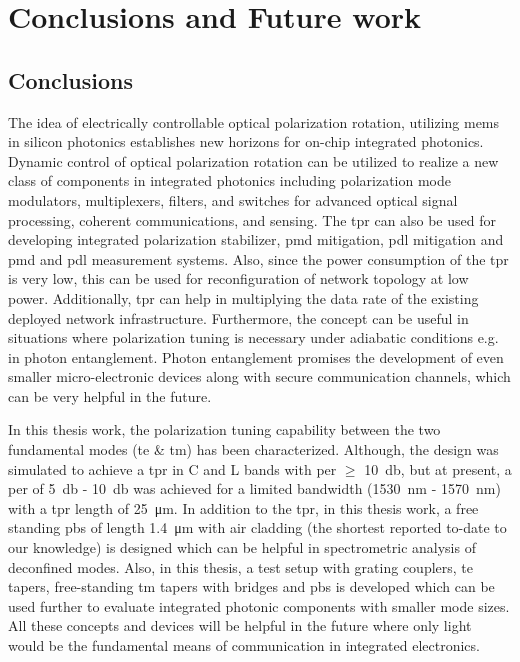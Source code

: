 \documentclass[../report.tex]{subfiles}
\begin{document}
		
\chapter{Conclusions and Future work}

\section{Conclusions}
The idea of electrically controllable optical polarization rotation, utilizing \gls{mems} in silicon photonics establishes new horizons for on-chip integrated photonics. Dynamic control of optical polarization rotation can be utilized to realize a new class of components in integrated photonics including polarization mode modulators, multiplexers, filters, and switches for advanced optical signal processing, coherent communications, and sensing. The \gls{tpr} can also be used for developing integrated polarization stabilizer, \gls{pmd} mitigation, \gls{pdl} mitigation and \gls{pmd} and \gls{pdl} measurement systems. Also, since the power consumption of the \gls{tpr} is very low, this can be used for reconfiguration of network topology at low power. Additionally, \gls{tpr} can help in multiplying the data rate of the existing deployed network infrastructure. Furthermore, the concept can be useful in situations where polarization tuning is necessary under adiabatic conditions e.g. in photon entanglement. Photon entanglement promises the development of even smaller micro-electronic devices along with secure communication channels, which can be very helpful in the future. \par 

In this thesis work, the polarization tuning capability between the two fundamental modes (\gls{te} \& \gls{tm}) has been characterized. Although, the design was simulated to achieve a \gls{tpr} in C and L bands with \gls{per} $\geq$ \SI{10}{\decibel}, but at present, a \gls{per} of \SI{5}{\decibel} - \SI{10}{\decibel} was achieved for a limited bandwidth (\SI{1530}{\nano \meter} - \SI{1570}{\nano \meter}) with a \gls{tpr} length of \SI{25}{\micro \meter}. In addition to the \gls{tpr}, in this thesis work, a free standing \gls{pbs} of length \SI{1.4}{\micro \meter} with air cladding (the shortest reported to-date to our knowledge) is designed which can be helpful in spectrometric analysis of deconfined modes. Also, in this thesis, a test setup with grating couplers, \gls{te} tapers, free-standing \gls{tm} tapers with bridges and \gls{pbs} is developed which can be used further to evaluate integrated photonic components with smaller mode sizes. All these concepts and devices will be helpful in the future where only light would be the fundamental means of communication in integrated electronics.
\end{document}

